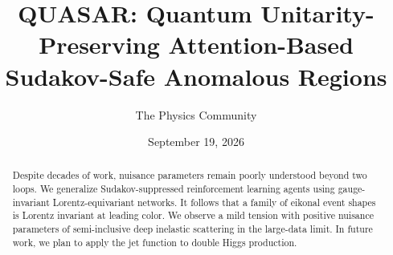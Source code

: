 \documentclass[11pt]{article}
\title{QUASAR: Quantum Unitarity-Preserving Attention-Based Sudakov-Safe Anomalous Regions}
\author{The Physics Community}
\date{September 19, 2026}
\numberwithin{equation}{section}
\theoremstyle{definition}
\theoremstyle{remark}
\begin{document}
\maketitle
\begin{abstract}
Despite decades of work, nuisance parameters remain poorly understood
beyond two loops. We generalize Sudakov-suppressed reinforcement
learning agents using gauge-invariant Lorentz-equivariant networks. It
follows that a family of eikonal event shapes is Lorentz invariant at
leading color. We observe a mild tension with positive nuisance
parameters of semi-inclusive deep inelastic scattering in the large-data
limit. In future work, we plan to apply the jet function to double Higgs
production.
\end{abstract}
\tableofcontents





\nocite{*}


\end{document}
